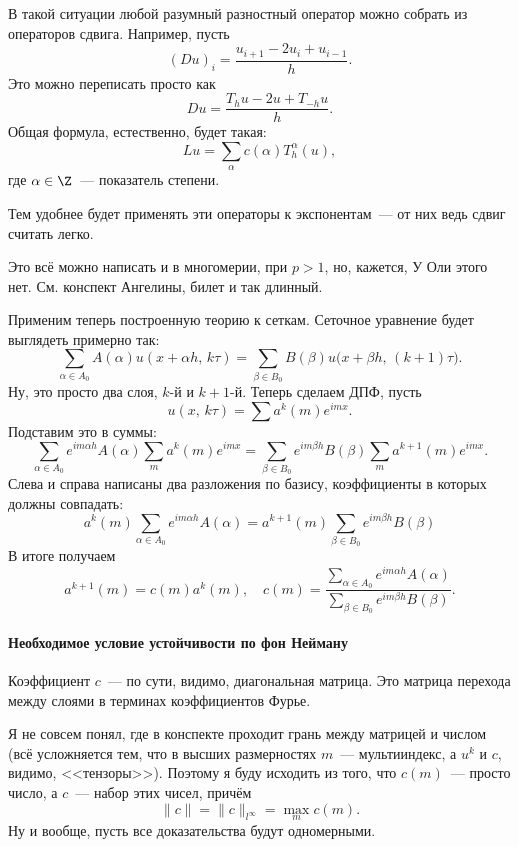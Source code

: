 \documentclass{trlnotes}
\begin{document}
\begin{rem}
	В такой ситуации любой разумный разностный оператор можно собрать из операторов сдвига. Например, пусть
	\[
		(Du)_i = \dfrac{u_{i + 1} - 2u_i + u_{i - 1}}{h}.
	\]
	Это можно переписать просто как
	\[
		Du = \dfrac{T_hu - 2u + T_{-h}u}{h}.
	\]
	Общая формула, естественно, будет такая:
	\[
		Lu = \sum\limits_{\alpha} c(\alpha) T_h^{\alpha}(u),
	\]
	где $\alpha \in \Z$~--- показатель степени.

	Тем удобнее будет применять эти операторы к экспонентам~--- от них ведь сдвиг считать легко.
\end{rem}

Это всё можно написать и в многомерии, при $p>1$, но, кажется, У Оли этого нет. См. конспект Ангелины, билет и так длинный.

Применим теперь построенную теорию к сеткам. Сеточное уравнение будет выглядеть примерно так:
\[
	\sum\limits_{\alpha \in A_0} A(\alpha) u(x + \alpha h, \, k \tau) = \sum\limits_{\beta \in B_0} B(\beta) u\big(x + \beta h, \, (k+1) \tau\big).
\]
Ну, это просто два слоя, $k$-й и $k+1$-й. Теперь сделаем ДПФ, пусть
\[
	u(x, \, k\tau) = \sum a^k(m) e^{imx}.
\]
Подставим это в суммы:
\[
	\sum\limits_{\alpha \in A_0} e^{im\alpha h} A(\alpha) \sum\limits_m a^k(m) e^{imx} = \sum\limits_{\beta \in B_0} e^{im\beta h} B(\beta) \sum\limits_m a^{k+1}(m) e^{imx}.
\]
Слева и справа написаны два разложения по базису, коэффициенты в которых должны совпадать:
\[
	a^k(m) \sum\limits_{\alpha \in A_0} e^{im\alpha h} A(\alpha)  = a^{k+1}(m) \sum\limits_{\beta \in B_0} e^{im\beta h} B(\beta) 
\]
В итоге получаем
\[
	a^{k + 1}(m) = c(m) a^k(m), \quad c(m) = \dfrac{\sum\limits_{\alpha \in A_0} e^{im\alpha h} A(\alpha)}{\sum\limits_{\beta \in B_0} e^{im\beta h} B(\beta)}.
\]

\paragraph{Необходимое условие устойчивости по фон Нейману}\label{par:neumann}

\begin{rem} 
	Коэффициент $c$~--- по сути, видимо, диагональная матрица. Это матрица перехода между слоями в терминах коэффициентов Фурье. 

	Я не совсем понял, где в конспекте проходит грань между матрицей и числом (всё усложняется тем, что в высших размерностях $m$~--- мультииндекс, а $u^k$ и $c$, видимо, <<тензоры>>). Поэтому я буду исходить из того, что $c(m)$~--- просто число, а $c$~--- набор этих чисел, причём
	\[  
		\|c\| = \|c\|_{l^{\infty}} = \max\limits_m c(m).
	\]
	Ну и вообще, пусть все доказательства будут одномерными.
\end{rem}
\end{document}
